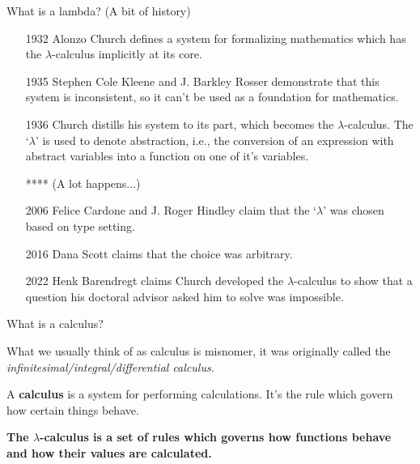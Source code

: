 \documentclass[10pt]{beamer}
\begin{document}
\begin{frame}{What is a lambda? (A bit of history)}

\begin{itemize}
\item[1932] Alonzo Church defines a system for formalizing mathematics which has the $\lambda$-calculus implicitly at its core.
\pause
\item[1935] Stephen Cole Kleene and J. Barkley Rosser demonstrate that this system is inconsistent, so it can't be used as a foundation for mathematics.
\pause
\item[1936] Church distills his system to its  part, which becomes the $\lambda$-calculus. The `$\lambda$' is used to denote abstraction, i.e., the conversion of an expression with abstract variables into a function on one of it's variables.
\pause
\item[****] (A lot happens...)
\pause
\item[2006] Felice Cardone and J. Roger Hindley claim that the `$\lambda$' was chosen based on type setting.
\pause
\item[2016] Dana Scott claims that the choice was arbitrary.
\pause
\item[2022] Henk Barendregt claims Church developed the $\lambda$-calculus to show that a question his doctoral advisor asked him to solve was impossible.
\end{itemize}
\end{frame}

\begin{frame}{What is a calculus?}

What we usually think of as calculus is misnomer, it was originally called the \textit{infinitesimal/integral/differential calculus}.
\nxt

\begin{definition}
A \textbf{calculus} is a system for performing calculations. It's the rule which govern how certain things behave.
\end{definition}
\nxt

\textbf{The $\lambda$-calculus is a set of rules which governs how functions behave and how their values are calculated.}

\end{frame}
\end{document}
